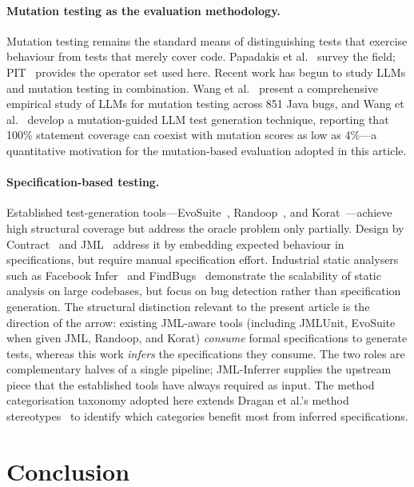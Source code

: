 \documentclass[11pt]{article}
\begin{document}
\paragraph{Mutation testing as the evaluation methodology.}
Mutation testing remains the standard means of distinguishing tests that exercise behaviour from tests that merely cover code. Papadakis et al.~\cite{papadakis2019mutation} survey the field; PIT~\cite{coles2016pitest} provides the operator set used here. Recent work has begun to study LLMs and mutation testing in combination. Wang et al.~\cite{wang2024llmmutation} present a comprehensive empirical study of LLMs for mutation testing across 851 Java bugs, and Wang et al.~\cite{wang2025mutgen} develop a mutation-guided LLM test generation technique, reporting that 100\% statement coverage can coexist with mutation scores as low as 4\%---a quantitative motivation for the mutation-based evaluation adopted in this article.

\paragraph{Specification-based testing.}
Established test-generation tools---EvoSuite~\cite{fraser2011evosuite}, Randoop~\cite{pacheco2007randoop}, and Korat~\cite{boyapati2002korat}---achieve high structural coverage but address the oracle problem only partially. Design by Contract~\cite{meyer1992design} and JML~\cite{jml, leavens2006design} address it by embedding expected behaviour in specifications, but require manual specification effort. Industrial static analysers such as Facebook Infer~\cite{calcagno2015infer} and FindBugs~\cite{hovemeyer2004finding} demonstrate the scalability of static analysis on large codebases, but focus on bug detection rather than specification generation. The structural distinction relevant to the present article is the direction of the arrow: existing JML-aware tools (including JMLUnit, EvoSuite when given JML, Randoop, and Korat) \emph{consume} formal specifications to generate tests, whereas this work \emph{infers} the specifications they consume. The two roles are complementary halves of a single pipeline; JML-Inferrer supplies the upstream piece that the established tools have always required as input. The method categorisation taxonomy adopted here extends Dragan et al.'s method stereotypes~\cite{dragan2006reverse} to identify which categories benefit most from inferred specifications.

\section{Conclusion}
\label{sec:conclusion}
\end{document}
